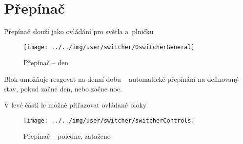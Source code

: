 
\section{Přepínač}

Přepínač slouží jako ovládání pro světla a~plničku

\begin{figure}[!ht]\centering
\texttt{[image: ../../img/user/switcher/0switcherGeneral]}

\caption{Přepínač -- den}
\label{fig:user_switcher_0switcherGeneral}

\end{figure}

\FloatBarrier

Blok umožňuje reagovat na denní dobu -- automatické přepínání na definovaný stav, pokud začne den, nebo začne noc.

V levé části le možné přiřazovat ovládané bloky

\begin{figure}[!ht]\centering
\texttt{[image: ../../img/user/switcher/switcherControls]}

\caption{Přepínač -- poledne, zataženo}
\label{fig:user_switcher_switcherControls}

\end{figure}


\FloatBarrier